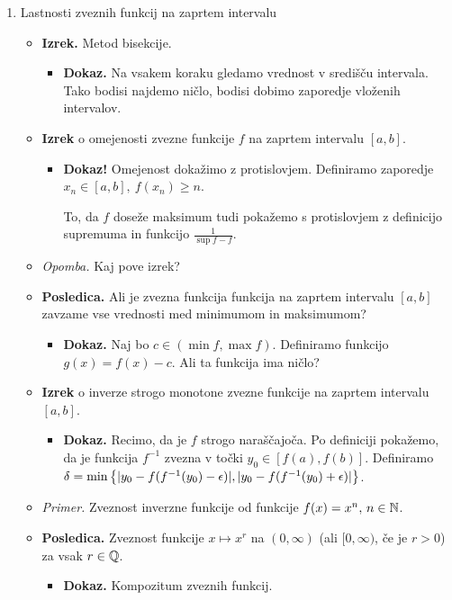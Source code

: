 \begin{enumerate}
    \item Lastnosti zveznih funkcij na zaprtem intervalu
    \begin{itemize}
        \item \colorbox{blue!30}{\textbf{Izrek.}} Metod bisekcije.        
        \begin{itemize}
            \item \colorbox{green!30}{\textbf{Dokaz.}} Na vsakem koraku gledamo vrednost v središču intervala. Tako bodisi najdemo ničlo, bodisi dobimo zaporedje vloženih intervalov.
        \end{itemize}
        \item \colorbox{blue!30}{\textbf{Izrek}} o omejenosti zvezne funkcije $f$ na zaprtem intervalu $[a,b]$.
        \begin{itemize}
            \item \colorbox{green!50}{\textbf{Dokaz!}} Omejenost dokažimo z protislovjem. Definiramo zaporedje $x_n \in [a,b], \ f(x_n) \geq n$.
            
            To, da $f$ doseže maksimum tudi pokažemo s protislovjem z definicijo supremuma in funkcijo $\frac{1}{\sup f - f}$.
        \end{itemize}
        \item \colorbox{yellow!30}{\emph{Opomba.}} Kaj pove izrek?
        \item \colorbox{orange!30}{\textbf{Posledica.}} Ali je zvezna funkcija funkcija na zaprtem intervalu $[a,b]$ zavzame vse vrednosti med minimumom in maksimumom?
        \begin{itemize}
            \item \colorbox{green!30}{\textbf{Dokaz.}} Naj bo $c \in (\min f, \max f)$. Definiramo funkcijo $g(x) = f(x) - c$. Ali ta funkcija ima ničlo?
        \end{itemize}
        \item \colorbox{blue!30}{\textbf{Izrek}} o inverze strogo monotone zvezne funkcije na zaprtem intervalu $[a,b]$.
        \begin{itemize}
            \item \colorbox{green!30}{\textbf{Dokaz.}} Recimo, da je $f$ strogo naraščajoča. Po definiciji pokažemo, da je funkcija $f^{-1}$ zvezna v točki $y_0 \in [f(a), f(b)]$. Definiramo $\delta = \min \left\{|y_0 - f(f^{-1}(y_0) - \epsilon)|, |y_0 - f(f^{-1}(y_0) + \epsilon)|\right\}$.
        \end{itemize}
        \item \colorbox{yellow!30}{\emph{Primer.}} Zveznost inverzne funkcije od funkcije $f(x) = x^n, \, n \in \mathbb{N}$.
        \item \colorbox{orange!30}{\textbf{Posledica.}} Zveznost funkcije $x \mapsto x^r$ na $(0, \infty)$ (ali $[0, \infty)$, če je $r>0$) za vsak $r \in \mathbb{Q}$.
        \begin{itemize}
            \item \colorbox{green!30}{\textbf{Dokaz.}} Kompozitum zveznih funkcij.
        \end{itemize}
    \end{itemize}


\end{enumerate}
